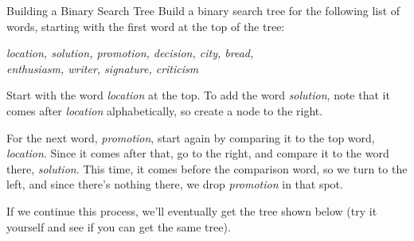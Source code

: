 \begin{example}[https://www.youtube.com/watch?v=A31V6w6qtus&list=PLfmpjsIzhztst_PxJXo574wshSwxU9Yg_&index=11]{Building a Binary Search Tree}
Build a binary search tree for the following list of words, starting with the first word at the top of the tree:
\begin{center}
\emph{location, solution, promotion, decision, city, bread,\\ enthusiasm, writer, signature, criticism}
\end{center}

\sol
Start with the word \emph{location} at the top.  To add the word \emph{solution}, note that it comes after \emph{location} alphabetically, so create a node to the right.
\begin{center}
\end{center}

For the next word, \emph{promotion}, start again by comparing it to the top word, \emph{location}.  Since it comes after that, go to the right, and compare it to the word there, \emph{solution}.  This time, it comes before the comparison word, so we turn to the left, and since there's nothing there, we drop \emph{promotion} in that spot.
\begin{center}
\end{center}

If we continue this process, we'll eventually get the tree shown below (try it yourself and see if you can get the same tree).


\end{example}
